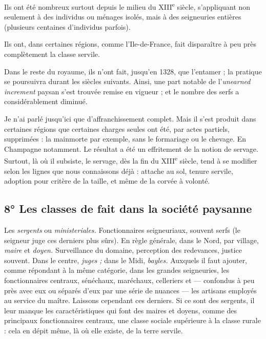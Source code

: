 \documentclass[french,twoside]{book} %
\newcommand{\labelchar}[1]{{\color{rubric}\bf #1}}
\begin{document}
\begin{listalpha}[itemsep=0pt,]
\item[] \hspace{-1.5em}{\bfseries Du moins, quelques faits ressortent clairement :}
\item Ils ont été nombreux surtout depuis le milieu du XIII\textsuperscript{e} siècle, s’appliquant non seulement à des individus ou ménages isolés, mais à des seigneuries entières (plusieurs centaines d’individus parfois).
\item Ils ont, dans certaines régions, comme l’Ile-de-France, fait disparaître à peu près complètement la classe servile.
\item Dans le reste du royaume, ils n’ont fait, jusqu’en 1328, que l’entamer ; la pratique se poursuivra durant les siècles suivants. Ainsi, une part notable de l’{\itshape unearned increment} paysan s’est trouvée remise en vigueur ; et le nombre des serfs a considérablement diminué.

\end{listalpha}\noindent Je n’ai parlé jusqu’ici que d’affranchissement complet. Mais il s’est produit dans certaines régions que certaines charges seules ont été, par actes partiels, supprimées : la mainmorte par exemple, sans le formariage ou le chevage. En Champagne notamment. Le résultat a été un effritement de la notion de servage. Surtout, là où il subsiste, le servage, dès la fin du XIII\textsuperscript{e} siècle, tend à se modifier selon les lignes que nous connaissons déjà : attache au sol, tenure servile, adoption pour critère de la taille, et même de la corvée à volonté.
\subsection[8° Les classes de fait dans la société paysanne]{8° Les classes de fait dans la société paysanne}
\noindent \labelchar{a)} Les {\itshape sergents} ou {\itshape ministeriales.} Fonctionnaires seigneuriaux, souvent serfs (le seigneur juge ces derniers plus sûrs). En règle générale, dans le Nord, par village, {\itshape maire} et {\itshape doyen.} Surveillance du domaine, perception des redevances, justice souvent. Dans le centre, {\itshape juges ;} dans le Midi, {\itshape bayles.} Auxquels il faut ajouter, comme répondant à la même catégorie, dans les grandes seigneuries, les fonctionnaires centraux, sénéchaux, maréchaux, celleriers et — confondus à peu près avec eux ou séparés d’eux par une série de nuances — les artisans employés au service du maître. Laissons cependant ces derniers. Si ce sont des sergents, il leur manque les caractéristiques qui font des maires et doyens, comme des principaux fonctionnaires centraux, une classe sociale supérieure à la classe rurale : cela en dépit même, là où elle existe, de la terre servile.\par
\end{document}
